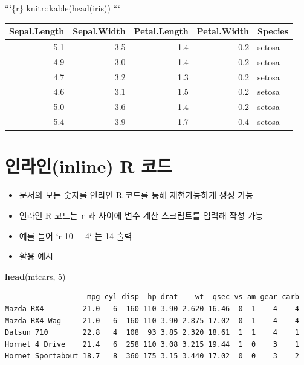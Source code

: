 \documentclass[
  11pt,
]{krantz}
\newenvironment{Shaded}{\begin{snugshade}}{\end{snugshade}}
\newcommand{\BaseNTok}[1]{\textcolor[rgb]{0.06,0.06,0.06}{#1}}
\newcommand{\DecValTok}[1]{\textcolor[rgb]{0.06,0.06,0.06}{#1}}
\newcommand{\KeywordTok}[1]{\textcolor[rgb]{0.27,0.27,0.27}{\textbf{#1}}}
\newcommand{\NormalTok}[1]{#1}
\providecommand{\tightlist}{%
  \setlength{\itemsep}{0pt}\setlength{\parskip}{0pt}}
\begin{document}
\begin{Shaded}
\begin{Highlighting}[]
\BaseNTok{```\{r\}}
\BaseNTok{knitr::kable(head(iris))}
\BaseNTok{```}
\end{Highlighting}
\end{Shaded}

\footnotesize

\begin{tabular}{r|r|r|r|l}
\hline
Sepal.Length & Sepal.Width & Petal.Length & Petal.Width & Species\\
\hline
5.1 & 3.5 & 1.4 & 0.2 & setosa\\
\hline
4.9 & 3.0 & 1.4 & 0.2 & setosa\\
\hline
4.7 & 3.2 & 1.3 & 0.2 & setosa\\
\hline
4.6 & 3.1 & 1.5 & 0.2 & setosa\\
\hline
5.0 & 3.6 & 1.4 & 0.2 & setosa\\
\hline
5.4 & 3.9 & 1.7 & 0.4 & setosa\\
\hline
\end{tabular}

\normalsize

\hypertarget{inline-code}{%
\section{인라인(inline) R 코드}\label{inline-code}}

\begin{itemize}
\tightlist
\item
  문서의 모든 숫자를 인라인 R 코드를 통해 재현가능하게 생성 가능
\item
  인라인 R 코드는 \texttt{\textasciigrave{}r} 과 \texttt{\textasciigrave{}} 사이에 변수 계산 스크립트를 입력해 작성 가능
\item
  예를 들어 {`}r 10 + 4` 는 14 출력
\item
  활용 예시
\end{itemize}

\footnotesize

\begin{Shaded}
\begin{Highlighting}[]
\KeywordTok{head}\NormalTok{(mtcars, }\DecValTok{5}\NormalTok{)}
\end{Highlighting}
\end{Shaded}

\begin{verbatim}
                   mpg cyl disp  hp drat    wt  qsec vs am gear carb
Mazda RX4         21.0   6  160 110 3.90 2.620 16.46  0  1    4    4
Mazda RX4 Wag     21.0   6  160 110 3.90 2.875 17.02  0  1    4    4
Datsun 710        22.8   4  108  93 3.85 2.320 18.61  1  1    4    1
Hornet 4 Drive    21.4   6  258 110 3.08 3.215 19.44  1  0    3    1
Hornet Sportabout 18.7   8  360 175 3.15 3.440 17.02  0  0    3    2
\end{verbatim}
\end{document}
